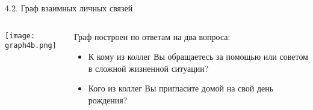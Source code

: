 \begin{frame}{4.2. Граф взаимных личных связей}

\begin{columns}[T] 
\begin{column}{0.8\textwidth} 
\centering
          \texttt{[image: graph4b.png]}
\end{column}
\begin{column}{0.2\textwidth} 
\tiny
Граф построен по ответам на два вопроса:
\begin{itemize}
\item К кому из коллег Вы обращаетесь за помощью или советом в сложной жизненной ситуации?
\item Кого из коллег Вы пригласите домой на свой день рождения?
\end{itemize}
\end{column}
\end{columns}
\end{frame}


